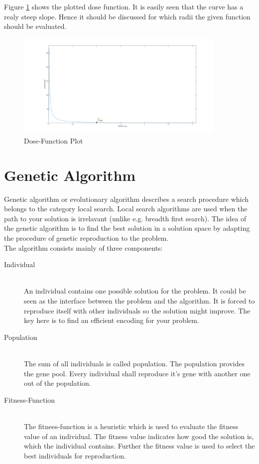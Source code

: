 \documentclass[12pt]{article}
\begin{document}
Figure \ref{fig:doseplot} shows the plotted dose function. It is easily seen that the curve has a realy steep slope. Hence it should be discussed for which radii the given function should be evaluated.

\begin{figure}[htbp]

\centering
\includegraphics[width=0.9\textwidth]{pictures/dosefunction}
\caption{Dose-Function Plot}
\label{fig:doseplot}
\end{figure}
\section{Genetic Algorithm}
\label{sec:genalg}

Genetic algorithm  or evolutionary algorithm \cite{genpro} describes a search procedure which belongs to the category local search\cite{aima}. Local search algorithms are used when the path to your solution is irrelavant (unlike e.g. breadth first search). The idea of the genetic algorithm is to find the best solution in a solution space by adapting the procedure of genetic reproduction to the problem. \\ 
The algorithm consists mainly of three components:

\begin{description}
\item[Individual] ~\\
\label{indiv}
An individual contains one possible solution for the problem. It could be seen as the interface between the problem and the algorithm.  It is forced to reproduce itself with other individuals so the solution might improve. The key here is to find an efficient encoding for your problem.
\item[Population]~\\
\label{pop}
The sum of all individuals is called population. The population provides the gene pool. Every individual shall reproduce it's gene with another one out of the population. 
\item[Fitness-Function] ~\\
\label{fifu}
The fitnees-function is a heuristic which is used to evaluate the fitness value of an individual. The fitness value indicates how good the solution is, which the individual contains. Further the fitness value is used to select the best individuals for reproduction.
\end{description} 
\end{document}
